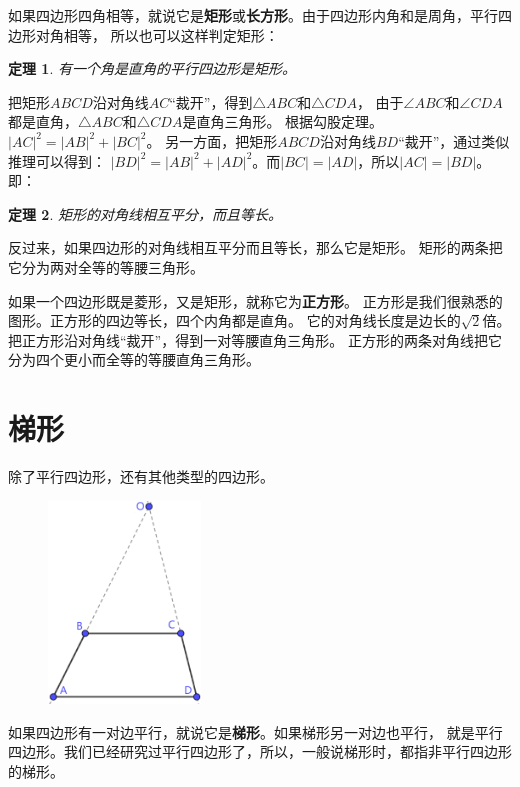 \documentclass[12pt,UTF8]{ctexbook}
\newtheorem{tm}{定理}[section]
\begin{document}
如果四边形四角相等，就说它是\textbf{矩形}或\textbf{长方形}。由于四边形内角和是周角，平行四边形对角相等，
所以也可以这样判定矩形：
\begin{tm}\label{tm:0-1-10}
    有一个角是直角的平行四边形是矩形。
\end{tm}

把矩形$ABCD$沿对角线$AC$“裁开”，得到$\triangle ABC$和$\triangle CDA$，
由于$\angle ABC$和$\angle CDA$都是直角，$\triangle ABC$和$\triangle CDA$是直角三角形。
根据勾股定理。$|AC|^2 = |AB|^2 + |BC|^2$。
另一方面，把矩形$ABCD$沿对角线$BD$“裁开”，通过类似推理可以得到：
$|BD|^2 = |AB|^2 + |AD|^2$。而$|BC| = |AD|$，所以$|AC| = |BD|$。即：
\begin{tm}\label{tm:0-1-15}
    矩形的对角线相互平分，而且等长。
\end{tm}

反过来，如果四边形的对角线相互平分而且等长，那么它是矩形。
矩形的两条把它分为两对全等的等腰三角形。

如果一个四边形既是菱形，又是矩形，就称它为\textbf{正方形}。
正方形是我们很熟悉的图形。正方形的四边等长，四个内角都是直角。
它的对角线长度是边长的$\sqrt{2}$倍。把正方形沿对角线“裁开”，得到一对等腰直角三角形。
正方形的两条对角线把它分为四个更小而全等的等腰直角三角形。

\section{梯形}
除了平行四边形，还有其他类型的四边形。

\begin{figure} %
    \vspace{-35pt}
    \centering
    \includegraphics[width=0.36\textwidth]{梯形1.png}
\end{figure}

如果四边形有一对边平行，就说它是\textbf{梯形}。如果梯形另一对边也平行，
就是平行四边形。我们已经研究过平行四边形了，所以，一般说梯形时，都指非平行四边形的梯形。
\end{document}
